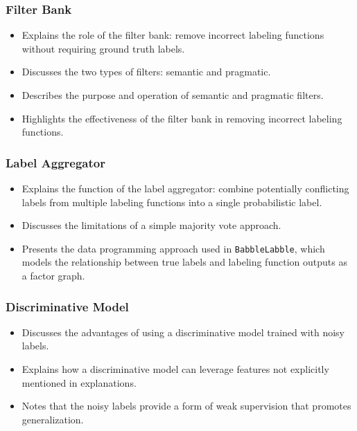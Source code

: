 \documentclass[
  letterpaper,
  DIV=11,
  numbers=noendperiod,
  oneside]{scrartcl}
\providecommand{\tightlist}{%
  \setlength{\itemsep}{0pt}\setlength{\parskip}{0pt}}
\begin{document}
\subsubsection{Filter Bank}\label{filter-bank}

\begin{itemize}
\tightlist
\item
  Explains the role of the filter bank: remove incorrect labeling
  functions without requiring ground truth labels.
\item
  Discusses the two types of filters: semantic and pragmatic.
\item
  Describes the purpose and operation of semantic and pragmatic filters.
\item
  Highlights the effectiveness of the filter bank in removing incorrect
  labeling functions.
\end{itemize}

\subsubsection{Label Aggregator}\label{label-aggregator}

\begin{itemize}
\tightlist
\item
  Explains the function of the label aggregator: combine potentially
  conflicting labels from multiple labeling functions into a single
  probabilistic label.
\item
  Discusses the limitations of a simple majority vote approach.
\item
  Presents the data programming approach used in \texttt{BabbleLabble},
  which models the relationship between true labels and labeling
  function outputs as a factor graph.
\end{itemize}

\subsubsection{Discriminative Model}\label{discriminative-model}

\begin{itemize}
\tightlist
\item
  Discusses the advantages of using a discriminative model trained with
  noisy labels.
\item
  Explains how a discriminative model can leverage features not
  explicitly mentioned in explanations.
\item
  Notes that the noisy labels provide a form of weak supervision that
  promotes generalization.
\end{itemize}
\end{document}

